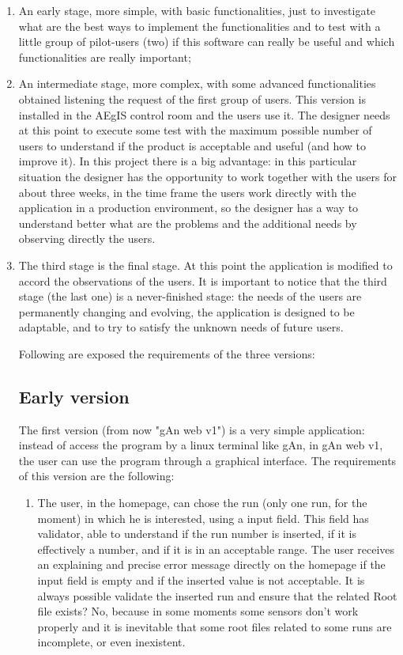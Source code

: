\begin{enumerate}

\item An early stage, more simple, with basic functionalities, just to investigate what are the best ways to implement the functionalities and to test with a little group of pilot-users (two) if this software can really be useful and which functionalities are really important;

\item An intermediate stage, more complex, with some advanced functionalities obtained listening the request of the first group of users. This version is installed in the AEgIS control room and the users use it. 
The designer needs at this point to execute some test with the maximum possible number of users to understand if the product is acceptable and useful (and how to improve it). 
In this project there is a big advantage: in this particular situation the designer has the opportunity to work together with the users for about three weeks, in the time frame the users work directly with the application in a production environment, so the designer has a way to understand better what are the problems and the additional needs by observing directly the users.

\item
The third stage is the final stage. At this point the application is modified to accord the observations of the users. It is important to notice that the third stage (the last one) is a never-finished stage: the needs of the users are permanently changing and evolving, the application is designed to be adaptable, and to try to satisfy the unknown needs of future users.
   
Following are exposed the requirements of the three versions:

\subsection{Early version}
The first version (from now "gAn web v1") is a very simple application: instead of access the program by a linux terminal like gAn, in gAn web v1, the user can 
use the program through a graphical interface. 
The requirements of this version are the following:
\begin{enumerate}

\item The user, in the homepage, can chose the run (only one run, for the moment) in which he is interested, using a input field. This field has validator, able to understand if the run number is inserted, if it is effectively a number, and if it is in an acceptable range. The user receives an explaining and precise error message directly on the homepage if the input field is empty and if the inserted value is not acceptable. It is always possible validate the inserted run and ensure that the related Root file exists? No, because in some moments some sensors don't work properly and it is inevitable that some root files related to some runs are incomplete, or even inexistent.


\end{enumerate}
\end{enumerate}
